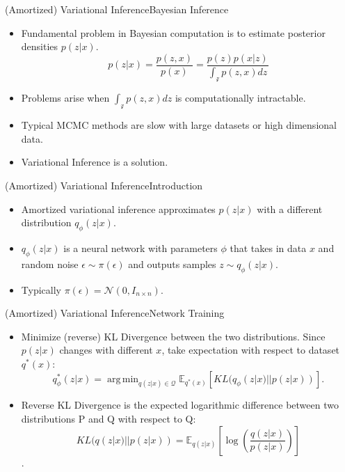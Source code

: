\documentclass{beamer}
\newcommand{\E}{\mathbb{E}}
\DeclareMathOperator*{\argmin}{arg\,min}
\begin{document}
\begin{frame}{(Amortized) Variational Inference}{Bayesian Inference}
  \begin{itemize}
  \item {
    Fundamental problem in Bayesian computation is to estimate posterior densities $p(z|x)$.
  }
  \begin{equation*}
p(z|x)=\frac{p(z,x)}{p(x)}= \frac{p(z)p(x|z)}{\int_\mathcal{z}p(z,x)dz}
\end{equation*}
  \item {   
    Problems arise when $\int_\mathcal{z}p(z,x)dz$ is computationally intractable.
  }
  \item {
    Typical MCMC methods are slow with large datasets or high dimensional data.
  }
  \item {
    Variational Inference is a solution.
  }
  \end{itemize}
\end{frame}
\begin{frame}{(Amortized) Variational Inference}{Introduction}
\begin{itemize}
\item Amortized variational inference approximates $p(z|x)$ with a different distribution $q_\phi(z|x)$.
\item $q_\phi(z|x)$ is a neural network with parameters $\phi$ that takes in data $x$ and random noise $\epsilon\sim \pi(\epsilon)$ and outputs samples $z\sim q_\phi(z|x)$.
\item Typically $\pi(\epsilon)=\mathcal{N}(0,I_{n\times n})$.
\begin{figure}[h]
  \centering
\end{figure}
\end{itemize}
\end{frame}
\begin{frame}{(Amortized) Variational Inference}{Network Training}
\begin{itemize}
\item Minimize (reverse) KL Divergence between the two distributions. Since $p(z|x)$ changes with different $x$, take expectation with respect to dataset $q^*(x)$:
\begin{equation*}
q^*_\phi(z|x)=\argmin_{q(z|x)\in \mathcal{Q}}\E_{q^*(x)}[KL(q_\phi(z|x)||p(z|x))].
\end{equation*}
\item Reverse KL Divergence is the expected logarithmic difference between two distributions P and Q with respect to Q:
\[KL(q(z|x)||p(z|x))=\mathbb{E}_{q(z|x)}\left[\log \left(\frac{q(z|x)}{p(z|x)}\right)\right]\].
\end{itemize}
\end{frame}
\end{document}
